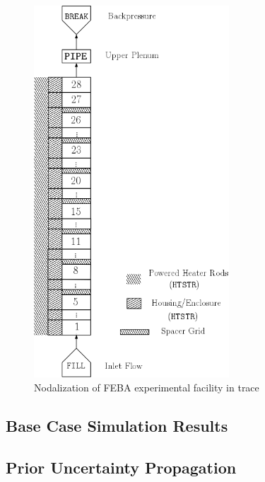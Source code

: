 \begin{figure}[bth]
    \centering
    \includegraphics[width=0.65\textwidth]{../figures/febaNodalization/febaNodalization.png}
    \caption[\gls{trace} nodalization of FEBA]{Nodalization of FEBA experimental facility in \gls{trace}}
    \label{fig:feba_nodalization}
\end{figure}

\subsection{Base Case Simulation Results}

\subsection{Prior Uncertainty Propagation}
